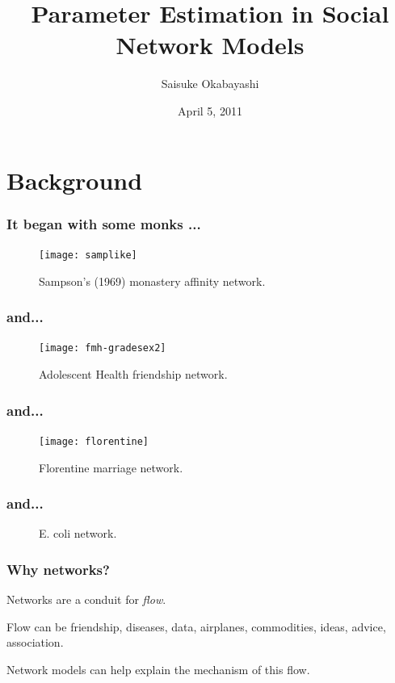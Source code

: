 \documentclass[compress, 9pt]{beamer}
\title{Parameter Estimation in Social Network Models}
\author{
  Saisuke Okabayashi %
  }
\institute{Department of Statistics \\ University of Minnesota}
\date{April 5, 2011}
\begin{document}

\frame{\titlepage}
\section{Background}


\frame
{
  \frametitle{It began with some monks ...}
\begin{figure}
\begin{center} 
\texttt{[image: samplike]}
\caption{Sampson's (1969) monastery affinity network.} 
\end{center} 
\label{fmh} 
\end{figure}
}
\frame
{
  \frametitle{and... }
\begin{figure}
\begin{center} 
\texttt{[image: fmh-gradesex2]}
\caption{Adolescent Health friendship network.} 
\end{center} 
\label{fmh} 
\end{figure}
}
\frame
{
  \frametitle{and... }

\begin{figure}
\begin{center} 
\texttt{[image: florentine]}
\caption{Florentine marriage network.} 
\end{center} 
\label{fmh} 
\end{figure}
}
\frame
{
  \frametitle{and...}

\begin{figure}
\begin{center} 
\caption{E. coli network.} 
\end{center} 
\label{fmh} 
\end{figure}
}

\frame
{
\frametitle{Why networks?}
Networks are a conduit for \emph{flow}.  

Flow can be friendship, diseases, data, airplanes, commodities, ideas, advice, association.

Network models can help explain the mechanism of this flow.
}
\end{document}
